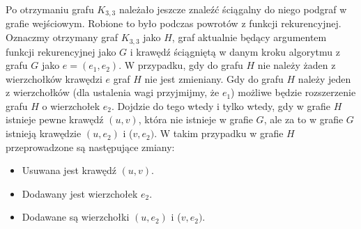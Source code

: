 \documentclass[a4 122pt]{article}
\begin{document}
Po otrzymaniu grafu $K_{3,3}$ należało jeszcze znaleźć ściągalny do niego podgraf w grafie wejściowym. Robione to było podczas powrotów z funkcji rekurencyjnej. Oznaczmy otrzymany graf $K_{3,3}$ jako $H$, graf 
aktualnie będący argumentem funkcji rekurencyjnej jako $G$  i krawędź ściągniętą w danym kroku algorytmu z grafu $G$ jako $e = (e_1, e_2)$. 
W przypadku, gdy do grafu $H$ nie należy żaden z wierzchołków krawędzi $e$ graf $H$ nie jest zmieniany.
Gdy do grafu $H$ należy jeden z wierzchołków (dla ustalenia wagi przyjmijmy, że $e_1$) możliwe będzie rozszerzenie grafu $H$ o wierzchołek $e_2$. Dojdzie do tego wtedy i tylko wtedy, gdy w grafie $H$ istnieje pewne krawędź 
$(u,v)$, która nie istnieje w grafie $G$, ale za to w grafie $G$ istnieją krawędzie $(u,e_2)$ i ($v,e_2)$.  W takim przypadku w grafie $H$ przeprowadzone są następujące zmiany:
\begin{itemize}
\item Usuwana jest krawędź $(u,v)$.
\item Dodawany jest wierzchołek $e_2$.
\item Dodawane są wierzchołki $(u,e_2)$ i ($v,e_2)$.
\end{itemize} 
\end{document}
